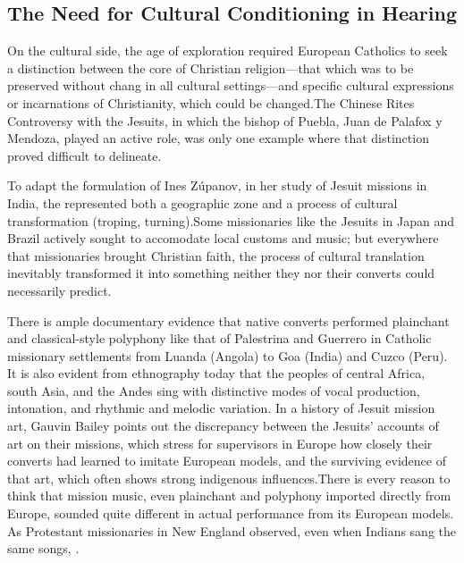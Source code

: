 \subsection{The Need for Cultural Conditioning in Hearing}

On the cultural side, the age of exploration required European Catholics to seek a distinction between the core of Christian religion---that which was to be preserved without chang in all cultural settings---and specific cultural expressions or incarnations of Christianity, which could be changed.
The Chinese Rites Controversy with the Jesuits, in which the bishop of Puebla, Juan de Palafox y Mendoza, played an active role, was only one example where that distinction proved difficult to delineate.

To adapt the formulation of Ines Zúpanov, in her study of Jesuit missions in India, the  represented both a geographic zone and a process of cultural transformation (troping, turning).\citXXX[Zupanov]
Some missionaries like the Jesuits in Japan and Brazil actively sought to accomodate local customs and music; but everywhere that missionaries brought Christian faith, the process of cultural translation inevitably transformed it into something neither they nor their converts could necessarily predict.

There is ample documentary evidence that native converts performed plainchant and classical-style polyphony like that of Palestrina and  Guerrero in Catholic missionary settlements from Luanda (Angola) to Goa (India) and Cuzco (Peru).\citXXX
It is also evident from ethnography today that the peoples of central Africa, south Asia, and the Andes sing with distinctive modes of vocal production, intonation, and rhythmic and melodic variation. 
In a history of Jesuit mission art, Gauvin Bailey points out the discrepancy between the Jesuits' accounts of art on their missions, which stress for supervisors in Europe how closely their converts had learned to imitate European models, and the surviving evidence of that art, which often shows strong indigenous influences.\citXXX[bailey]
There is every reason to think that mission music, even plainchant and polyphony imported directly from Europe, sounded quite different in actual performance from its European models.
As Protestant missionaries in New England observed, even when Indians sang the same songs, .\citXXX[goodman]
  
